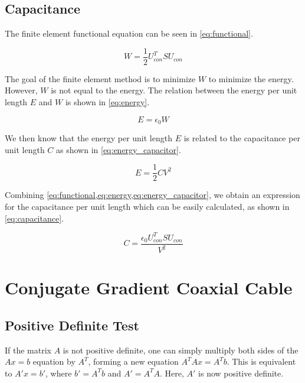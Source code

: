 \documentclass[a4paper,titlepage]{article}
\begin{document}
	\subsection{Capacitance}
	
	The finite element functional equation can be seen in \cref{eq:functional}.
	
	\begin{equation} \label{eq:functional}
		W = \frac{1}{2} U_{con}^T S U_{con}
	\end{equation}
	
	The goal of the finite element method is to minimize $W$ to minimize the energy. However, $W$ is not equal to the energy. The relation between the energy per unit length $E$ and $W$ is shown in \cref{eq:energy}.
	
	\begin{equation} \label{eq:energy}
		E = \epsilon_0 W
	\end{equation}
	
	We then know that the energy per unit length $E$ is related to the capacitance per unit length $C$ as shown in \cref{eq:energy_capacitor}.
	
	\begin{equation} \label{eq:energy_capacitor}
		E = \frac{1}{2} C V^2
	\end{equation}
	
	Combining \cref{eq:functional,eq:energy,eq:energy_capacitor}, we obtain an expression for the capacitance per unit length which can be easily calculated, as shown in \autoref{eq:capacitance}.
	
	\begin{equation} \label{eq:capacitance}
		C = \frac{\epsilon_0 U_{con}^T S U_{con}}{V^2}
	\end{equation}
	
	\section{Conjugate Gradient Coaxial Cable}
	
	\subsection{Positive Definite Test}
	
	If the matrix $A$ is not positive definite, one can simply multiply both sides of the $Ax = b$ equation by $A^T$, forming a new equation $A^TAx = A^Tb$. This is equivalent to $A'x = b'$, where $b' = A^Tb$ and $A' = A^TA$. Here, $A'$ is now positive definite.
	
\end{document}
